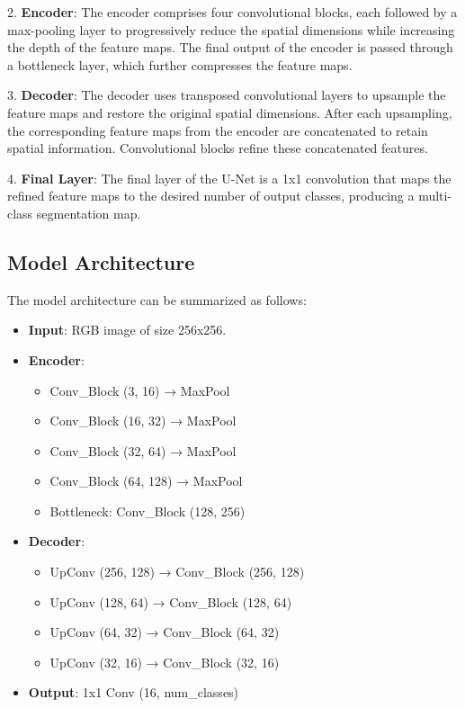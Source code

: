 \documentclass{article}
\begin{document}
2. \textbf{Encoder}:
    The encoder comprises four convolutional blocks, each followed by a max-pooling layer to progressively reduce the spatial dimensions while increasing the depth of the feature maps. The final output of the encoder is passed through a bottleneck layer, which further compresses the feature maps.

3. \textbf{Decoder}:
    The decoder uses transposed convolutional layers to upsample the feature maps and restore the original spatial dimensions. After each upsampling, the corresponding feature maps from the encoder are concatenated to retain spatial information. Convolutional blocks refine these concatenated features.

4. \textbf{Final Layer}:
    The final layer of the U-Net is a 1x1 convolution that maps the refined feature maps to the desired number of output classes, producing a multi-class segmentation map.

\subsection{Model Architecture}

The model architecture can be summarized as follows:

\begin{itemize}
    \item \textbf{Input}: RGB image of size 256x256.
    \item \textbf{Encoder}:
        \begin{itemize}
            \item Conv\_Block (3, 16) → MaxPool
            \item Conv\_Block (16, 32) → MaxPool
            \item Conv\_Block (32, 64) → MaxPool
            \item Conv\_Block (64, 128) → MaxPool
            \item Bottleneck: Conv\_Block (128, 256)
        \end{itemize}
    \item \textbf{Decoder}:
        \begin{itemize}
            \item UpConv (256, 128) → Conv\_Block (256, 128)
            \item UpConv (128, 64) → Conv\_Block (128, 64)
            \item UpConv (64, 32) → Conv\_Block (64, 32)
            \item UpConv (32, 16) → Conv\_Block (32, 16)
        \end{itemize}
    \item \textbf{Output}: 1x1 Conv (16, num\_classes)
\end{itemize}
\end{document}
